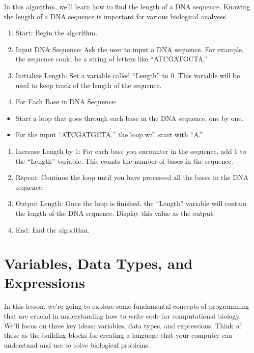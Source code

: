 \documentclass[
]{book}
\begin{document}
In this algorithm, we'll learn how to find the length of a DNA sequence. Knowing the length of a DNA sequence is important for various biological analyses.

\begin{enumerate}
\def\labelenumi{\arabic{enumi}.}
\item
  Start: Begin the algorithm.
\item
  Input DNA Sequence: Ask the user to input a DNA sequence. For example, the sequence could be a string of letters like ``ATCGATGCTA.''
\item
  Initialize Length: Set a variable called ``Length'' to 0. This variable will be used to keep track of the length of the sequence.
\item
  For Each Base in DNA Sequence:
\end{enumerate}

\begin{itemize}
\item
  Start a loop that goes through each base in the DNA sequence, one by one.
\item
  For the input ``ATCGATGCTA,'' the loop will start with ``A.''
\end{itemize}

\begin{enumerate}
\def\labelenumi{\arabic{enumi}.}
\setcounter{enumi}{4}
\item
  Increase Length by 1: For each base you encounter in the sequence, add 1 to the ``Length'' variable. This counts the number of bases in the sequence.
\item
  Repeat: Continue the loop until you have processed all the bases in the DNA sequence.
\item
  Output Length: Once the loop is finished, the ``Length'' variable will contain the length of the DNA sequence. Display this value as the output.
\item
  End: End the algorithm.
\end{enumerate}

\hypertarget{variables-data-types-and-expressions}{%
\section{Variables, Data Types, and Expressions}\label{variables-data-types-and-expressions}}

In this lesson, we're going to explore some fundamental concepts of programming that are crucial in understanding how to write code for computational biology. We'll focus on three key ideas: variables, data types, and expressions. Think of these as the building blocks for creating a language that your computer can understand and use to solve biological problems.
\end{document}
